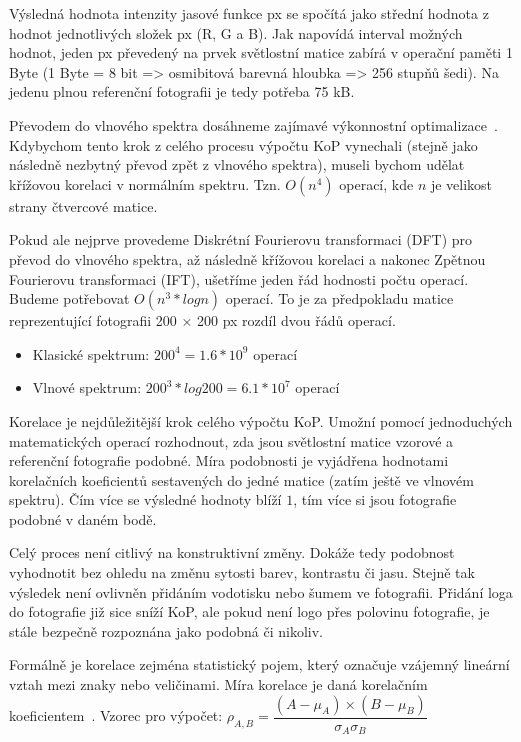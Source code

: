 Výsledná hodnota intenzity jasové funkce px se spočítá jako střední hodnota z hodnot jednotlivých složek px (R, G a B). Jak napovídá interval možných hodnot, jeden px převedený na prvek světlostní matice zabírá v operační paměti 1 Byte (1 Byte = 8 bit => osmibitová barevná hloubka => 256 stupňů šedi). Na jedenu plnou referenční fotografii je tedy potřeba 75 kB.

Převodem do vlnového spektra dosáhneme zajímavé výkonnostní optimalizace~\cite{FFT}. Kdybychom tento krok z celého procesu výpočtu KoP vynechali (stejně jako následně nezbytný převod zpět z vlnového spektra), museli bychom udělat křížovou korelaci v normálním spektru. Tzn. $ O(n^4) $ operací, kde $ n $ je velikost strany čtvercové matice.

Pokud ale nejprve provedeme Diskrétní Fourierovu transformaci (DFT) pro převod do vlnového spektra, až následně křížovou korelaci a nakonec Zpětnou Fourierovu transformaci (IFT), ušetříme jeden řád hodnosti počtu operací. Budeme potřebovat $ O(n^3 * logn) $ operací. To je za předpokladu matice reprezentující fotografii 200 × 200 px rozdíl dvou řádů operací.
\begin{itemize}
	\setlength{\parskip}{0pt}
	\setlength{\itemsep}{0pt}
	\item{Klasické spektrum: $ 200^4 = 1.6 * 10^9 $ operací}
	\item{Vlnové spektrum: $ 200^3 * log 200 = 6.1 * 10^7 $ operací}
\end{itemize}

Korelace je nejdůležitější krok celého výpočtu KoP. Umožní pomocí jednoduchých matematických operací rozhodnout, zda jsou světlostní matice vzorové a referenční fotografie podobné. Míra podobnosti je vyjádřena hodnotami korelačních koeficientů sestavených do jedné matice (zatím ještě ve vlnovém spektru). Čím více se výsledné hodnoty blíží $ 1 $, tím více si jsou fotografie podobné v daném bodě.

Celý proces není citlivý na konstruktivní změny. Dokáže tedy podobnost vyhodnotit bez ohledu na změnu sytosti barev, kontrastu či jasu. Stejně tak výsledek není ovlivněn přidáním vodotisku nebo šumem ve fotografii. Přidání loga do fotografie již sice sníží KoP, ale pokud není logo přes polovinu fotografie, je stále bezpečně rozpoznána jako podobná či nikoliv.

Formálně je korelace zejména statistický pojem, který označuje vzájemný lineární vztah mezi znaky nebo veličinami. Míra korelace je daná korelačním koeficientem~\cite{correlation}. 
Vzorec pro výpočet: $ \rho_{A,B} = \dfrac{(A - \mu_{A}) × (B - \mu_{B})}{\sigma_{A}\sigma_{B}} $

